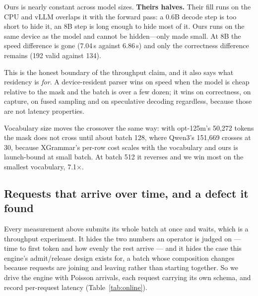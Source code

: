 \documentclass{article}
\begin{document}
Ours is nearly constant across model sizes. \textbf{Theirs halves.} Their fill
runs on the CPU and vLLM overlaps it with the forward pass: a 0.6B decode step
is too short to hide it, an 8B step is long enough to hide most of it. Ours
runs on the same device as the model and cannot be hidden---only made small. At
8B the speed difference is gone (7.04\,s against 6.86\,s) and only the
correctness difference remains (192 valid against 134).

This is the honest boundary of the throughput claim, and it also says what
residency is \emph{for}. A device-resident parser wins on speed when the model
is cheap relative to the mask and the batch is over a few dozen; it wins on
correctness, on capture, on fused sampling and on speculative decoding
regardless, because those are not latency properties.

Vocabulary size moves the crossover the same way: with opt-125m's 50{,}272
tokens the mask does not cross until about batch 128, where Qwen3's 151{,}669
crosses at 30, because XGrammar's per-row cost scales with the vocabulary and
ours is launch-bound at small batch. At batch 512 it reverses and we win most
on the smallest vocabulary, 7.1$\times$.

\subsection{Requests that arrive over time, and a defect it found}
\label{sec:eval-online}

Every measurement above submits its whole batch at once and waits, which is a
throughput experiment. It hides the two numbers an operator is judged on ---
time to first token and how evenly the rest arrive --- and it hides the case
this engine's admit/release design exists for, a batch whose composition
changes because requests are joining and leaving rather than starting together.
So we drive the engine with Poisson arrivals, each request carrying its own
schema, and record per-request latency (Table~\ref{tab:online}).
\end{document}
